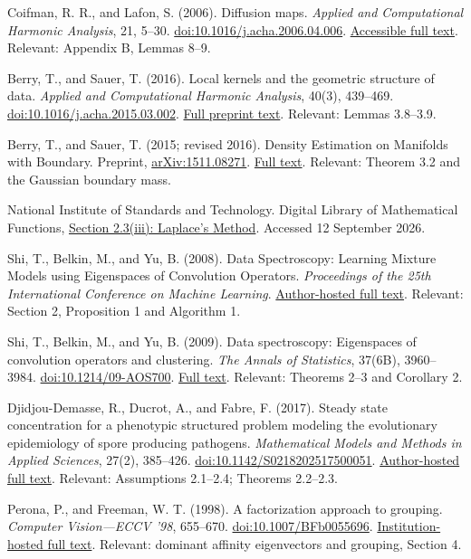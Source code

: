 \documentclass[10pt,a4paper]{article}
\newcommand{\pageheading}[2]{\newpage{\small\color{muted}#1}\par\vspace{2pt}{\LARGE\bfseries\color{ink}#2}\par\vspace{7pt}}
\begin{document}
\pageheading{11 / REFERENCES}{Primary sources and access points}
\small
\begin{enumerate}[label={[\arabic*]},itemsep=8pt]
\item Coifman, R. R., and Lafon, S. (2006). Diffusion maps. \emph{Applied and Computational Harmonic Analysis}, 21, 5--30. \href{https://doi.org/10.1016/j.acha.2006.04.006}{doi:10.1016/j.acha.2006.04.006}. \href{https://cis.temple.edu/~latecki/Courses/RobotFall08/Papers/DiffusionMaps06.pdf}{Accessible full text}. Relevant: Appendix B, Lemmas 8--9.
\item Berry, T., and Sauer, T. (2016). Local kernels and the geometric structure of data. \emph{Applied and Computational Harmonic Analysis}, 40(3), 439--469. \href{https://doi.org/10.1016/j.acha.2015.03.002}{doi:10.1016/j.acha.2015.03.002}. \href{https://arxiv.org/html/1407.1426v3}{Full preprint text}. Relevant: Lemmas 3.8--3.9.
\item Berry, T., and Sauer, T. (2015; revised 2016). Density Estimation on Manifolds with Boundary. Preprint, \href{https://arxiv.org/abs/1511.08271}{arXiv:1511.08271}. \href{https://arxiv.org/html/1511.08271v3}{Full text}. Relevant: Theorem 3.2 and the Gaussian boundary mass.
\item National Institute of Standards and Technology. Digital Library of Mathematical Functions, \href{https://dlmf.nist.gov/2.3\#iii}{Section 2.3(iii): Laplace's Method}. Accessed 12 September 2026.
\item Shi, T., Belkin, M., and Yu, B. (2008). Data Spectroscopy: Learning Mixture Models using Eigenspaces of Convolution Operators. \emph{Proceedings of the 25th International Conference on Machine Learning}. \href{https://www.stat.berkeley.edu/users/binyu/ps/ICML08.pdf}{Author-hosted full text}. Relevant: Section 2, Proposition 1 and Algorithm 1.
\item Shi, T., Belkin, M., and Yu, B. (2009). Data spectroscopy: Eigenspaces of convolution operators and clustering. \emph{The Annals of Statistics}, 37(6B), 3960--3984. \href{https://doi.org/10.1214/09-AOS700}{doi:10.1214/09-AOS700}. \href{https://arxiv.org/pdf/0807.3719}{Full text}. Relevant: Theorems 2--3 and Corollary 2.
\item Djidjou-Demasse, R., Ducrot, A., and Fabre, F. (2017). Steady state concentration for a phenotypic structured problem modeling the evolutionary epidemiology of spore producing pathogens. \emph{Mathematical Models and Methods in Applied Sciences}, 27(2), 385--426. \href{https://doi.org/10.1142/S0218202517500051}{doi:10.1142/S0218202517500051}. \href{https://lmah.univ-lehavre.fr/~ducrot/pdf/DemasseDucrotFabre_M3AS.pdf}{Author-hosted full text}. Relevant: Assumptions 2.1--2.4; Theorems 2.2--2.3.
\item Perona, P., and Freeman, W. T. (1998). A factorization approach to grouping. \emph{Computer Vision---ECCV '98}, 655--670. \href{https://doi.org/10.1007/BFb0055696}{doi:10.1007/BFb0055696}. \href{https://www.merl.com/publications/docs/TR99-03.pdf}{Institution-hosted full text}. Relevant: dominant affinity eigenvectors and grouping, Section 4.
\end{enumerate}
\normalsize
\end{document}

